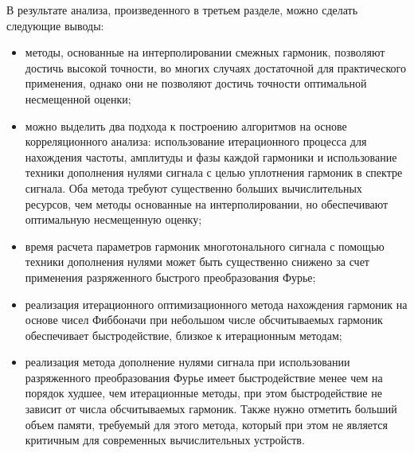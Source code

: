 В результате анализа, произведенного в третьем разделе, можно сделать следующие выводы:
\begin{itemize}
\item методы, основанные на интерполировании смежных гармоник, позволяют достичь высокой точности, во многих случаях достаточной для практического применения, однако они не позволяют достичь точности оптимальной несмещенной оценки;
	
\item можно выделить два подхода к построению алгоритмов на основе корреляционного анализа: использование итерационного процесса для нахождения частоты, амплитуды и фазы каждой гармоники и использование техники дополнения нулями сигнала с целью уплотнения гармоник в спектре сигнала. Оба метода требуют существенно больших вычислительных ресурсов, чем методы основанные на интерполировании, но обеспечивают оптимальную несмещенную оценку;
	
\item время расчета параметров гармоник многотонального сигнала с помощью техники дополнения нулями может быть существенно снижено за счет применения разряженного быстрого преобразования Фурье;
	
\item реализация итерационного оптимизационного метода нахождения гармоник на основе чисел Фиббоначи при небольшом числе обсчитываемых гармоник обеспечивает быстродействие, близкое к итерационным методам;
	
\item реализация метода дополнение нулями сигнала при использовании разряженного преобразования Фурье имеет быстродействие менее чем на порядок худшее, чем итерационные методы, при этом быстродействие не зависит от числа обсчитываемых гармоник. Также нужно отметить больший объем памяти, требуемый для этого метода, который при этом не является критичным для современных вычислительных устройств.
\end{itemize}


